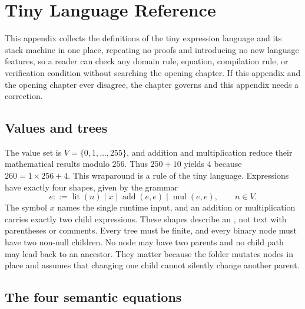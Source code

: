 \chapter{Tiny Language Reference}
\label{ch:app-a-tiny-reference}

This appendix collects the definitions of the tiny expression language and its stack machine in one place, repeating no proofs and introducing no new language features, so a reader can check any domain rule, equation, compilation rule, or verification condition without searching the opening chapter.
If this appendix and the opening chapter ever disagree, the chapter governs and this appendix needs a correction.

\section{Values and trees}
\label{sec:app-a-values-trees}

The value set is $V=\{0,1,\ldots,255\}$, and addition and multiplication reduce their mathematical results modulo $256$.
Thus $250+10$ yields $4$ because $260=1\times256+4$.
This wraparound is a  rule of the tiny language.
Expressions have exactly four shapes, given by the grammar
\begin{equation}
  e ::= \operatorname{lit}(n)
      \mid x
      \mid \operatorname{add}(e,e)
      \mid \operatorname{mul}(e,e),
  \qquad n\in V.
  \label{eq:app-a-grammar}
\end{equation}
The symbol $x$ names the single runtime input, and an addition or multiplication carries exactly two child expressions.
These shapes describe an , not text with parentheses or comments.
Every tree must be finite, and every binary node must have two non-null children.
No node may have two parents and no child path may lead back to an ancestor.
They matter because the folder mutates nodes in place and assumes that changing one child cannot silently change another parent.

\section{The four semantic equations}
\label{sec:app-a-semantics}

